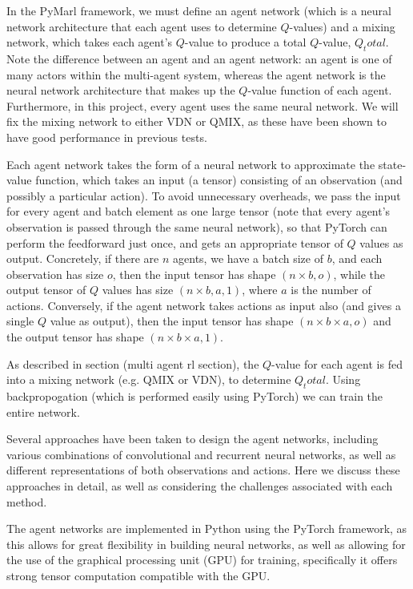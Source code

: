 In the PyMarl framework, we must define an agent network (which is a neural network architecture that each agent uses to determine $Q$-values) and a mixing network, which takes each agent's $Q$-value to produce a total $Q$-value, $Q_total$. Note the difference between an agent and an agent network: an agent is one of many actors within the multi-agent system, whereas the agent network is the neural network architecture that makes up the $Q$-value function of each agent. Furthermore, in this project, every agent uses the same neural network. We will fix the mixing network to either VDN or QMIX, as these have been shown to have good performance in previous tests. 


Each agent network takes the form of a neural network to approximate the state-value function, which takes an input (a tensor) consisting of an observation (and possibly a particular action). To avoid unnecessary overheads, we pass the input for every agent and batch element as one large tensor (note that every agent's observation is passed through the same neural network), so that PyTorch can perform the feedforward just once, and gets an appropriate tensor of $Q$ values as output. Concretely, if there are $n$ agents, we have a batch size of $b$, and each observation has size $o$, then the input tensor has shape $(n\times b, o)$, while the output tensor of $Q$ values has size $(n \times b, a, 1)$, where $a$ is the number of actions. Conversely, if the agent network takes actions as input also (and gives a single $Q$ value as output), then the input tensor has shape $(n\times b \times a, o)$ and the output tensor has shape $(n\times b \times a, 1)$.

As described in section (multi agent rl section), the $Q$-value for each agent is fed into a mixing network (e.g. QMIX or VDN), to determine $Q_total$. Using backpropogation (which is performed easily using PyTorch) we can train the entire network.

Several approaches have been taken to design the agent networks, including various combinations of convolutional and recurrent neural networks, as well as different representations of both observations and actions. Here we discuss these approaches in detail, as well as considering the challenges associated with each method.

The agent networks are implemented in Python using the PyTorch framework, as this allows for great flexibility in building neural networks, as well as allowing for the use of the graphical processing unit (GPU) for training, specifically it offers strong tensor computation compatible with the GPU.

